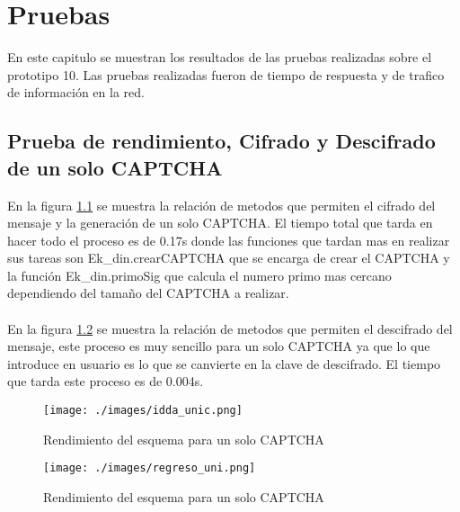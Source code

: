 \chapter{Pruebas}
En este capitulo se muestran los resultados de las pruebas realizadas sobre el prototipo 10. Las pruebas realizadas fueron de tiempo de respuesta y de trafico de información en la red.
\section{Prueba de rendimiento, Cifrado y Descifrado de un solo CAPTCHA}
En la figura \ref{fig:7-1} se muestra la relación de metodos que permiten el cifrado del mensaje y la generación de un solo CAPTCHA. El tiempo total que tarda en hacer todo el proceso es de 0.17s donde las funciones que tardan mas en realizar sus tareas son Ek\_din.crearCAPTCHA que se encarga de crear el CAPTCHA y la función Ek\_din.primoSig que calcula el numero primo mas cercano dependiendo del tamaño del CAPTCHA a realizar.\\\\
En la figura \ref{fig:7-2} se muestra la relación de metodos que permiten el descifrado del mensaje, este proceso es muy sencillo para un solo CAPTCHA ya que lo que introduce en usuario es lo que se canvierte en la clave de descifrado. El tiempo que tarda este proceso es de 0.004s.
\begin{figure}[H]
 \centering
 \texttt{[image: ./images/idda\_unic.png]}
		\caption{Rendimiento del esquema para un solo CAPTCHA}
		\label{fig:7-1}
\end{figure}

\begin{figure}[H]
 \centering
 \texttt{[image: ./images/regreso\_uni.png]}
		\caption{Rendimiento del esquema para un solo CAPTCHA}
		\label{fig:7-2}
\end{figure}
